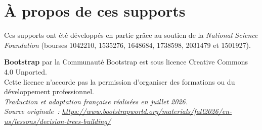 \documentclass[12pt,a4paper]{article}
\begin{document}
\section*{À propos de ces supports}

Ces supports ont été développés en partie grâce au soutien de la \emph{National Science Foundation} (bourses 1042210, 1535276, 1648684, 1738598, 2031479 et 1501927).

\begin{center}
  \textbf{Bootstrap} par la Communauté Bootstrap est sous licence Creative Commons 4.0 Unported.\\
  Cette licence n'accorde pas la permission d'organiser des formations ou du développement professionnel.\\[1em]
  \textit{Traduction et adaptation française réalisées en juillet 2026.}\\
  \textit{Source originale~: \url{https://www.bootstrapworld.org/materials/fall2026/en-us/lessons/decision-trees-building/}}
\end{center}
\end{document}
